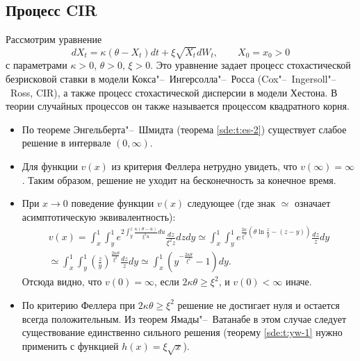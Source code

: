 \subsection{Процесс CIR}

Рассмотрим уравнение
\begin{equation}
\label{sde:cir}
d X_t = \kappa(\theta-X_t) dt + \xi\sqrt{X_t}dW_t, \qquad X_0=x_0>0
\end{equation}
с параметрами $\kappa>0$, $\theta>0$, $\xi>0$.
Это уравнение задает процесс стохастической безрисковой ставки в модели Кокса"--~Ингерсолла"--~Росса (Cox"--~Ingersoll"--~Ross, CIR), а также процесс стохастической дисперсии в модели Хестона.
В теории случайных процессов он также называется процессом квадратного корня.

\begin{itemize}
\item По теореме Энгельберта"--~Шмидта (теорема \ref{sde:t:es-2}) существует слабое решение  в интервале $(0,\infty)$.

\item Для функции $v(x)$ из критерия Феллера нетрудно увидеть, что $v(\infty)=\infty$. 
Таким образом, решение не уходит на бесконечность за конечное время.

\item При $x\to 0$ поведение функции $v(x)$ следующее (где знак $\simeq$ означает асимптотическую эквивалентность):
\begin{multline*}
v(x) = \int_x^1 \int_y^1 e^{2\int_y^z \frac{\kappa(\theta-u)}{\xi^2 u} du} \frac{dz}{\xi^2 z} dz dy
\simeq \int_x^1 \int_y^1 e^{\frac{2\kappa}{\xi^2}(\theta\ln\frac zy - (z-y))} \frac{dz}z dy \\
\simeq \int_x^1 \int_y^1 \left(\frac zy\right)^{\frac{2\kappa\theta}{\xi^2}} \frac {dz}{z} dy
\simeq \int_x^1 \left(y^{-\frac{2\kappa\theta}{\xi^2}} -1\right)dy.
\end{multline*}
Отсюда видно, что $v(0) = \infty$, если $2\kappa\theta\ge\xi^2$, и $v(0)<\infty$ иначе.

\item По критерию Феллера при $2\kappa\theta\ge\xi^2$ решение не достигает нуля и остается всегда положительным.
Из теорем Ямады"--~Ватанабе в этом случае следует существование единственно сильного решения (теорему \ref{sde:t:yw-1} нужно применить с функцией $h(x)=\xi\sqrt{x}$).


\end{itemize}
